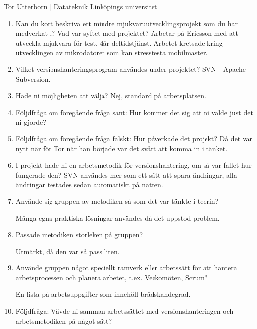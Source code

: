 \vspace{3em}
\begin{center}
    Tor Utterborn | Datateknik Linköpings universitet
\end{center}
\begin{enumerate}

  \item Kan du kort beskriva ett mindre mjukvaruutvecklingsprojekt som du har medverkat i? Vad var syftet med projektet?
  Arbetar på Ericsson med att utveckla mjukvara för test, 4år deltidstjänst.
  Arbetet kretsade kring utvecklingen av mikrodatorer som kan stresstesta mobilmaster.

  \item Vilket versionshanteringsprogram användes under projektet?
  SVN - Apache Subversion.

  \item Hade ni möjligheten att välja?
  Nej, standard på arbetsplatsen.

  \item Följdfråga om föregående fråga sant: Hur kommer det sig att ni valde just det ni gjorde?
  \item Följdfråga om föregående fråga falskt: Hur påverkade det projekt?
  Då det var nytt när för Tor när han började var det svårt att komma in i tänket.

  \item I projekt hade ni en arbetsmetodik för versionshantering, om så var fallet hur fungerade den?
  SVN användes mer som ett sätt att spara ändringar, alla ändringar testades sedan automatiskt på natten.

  \item Använde sig gruppen av metodiken så som det var tänkte i teorin?

  Många egna praktiska lösningar användes då det uppstod problem.

  \item Passade metodiken storleken på gruppen?

  Utmärkt, då den var så pass liten.

  \item Använde gruppen något speciellt ramverk eller arbetssätt för att hantera arbetsprocessen och planera arbetet, t.ex. Veckomöten, Scrum?

  En lista på arbetsuppgifter som innehöll brådskandegrad.

  \item Följdfråga: Vävde ni samman arbetssättet med versionshanteringen och arbetsmetodiken på något sätt?


\end{enumerate}

